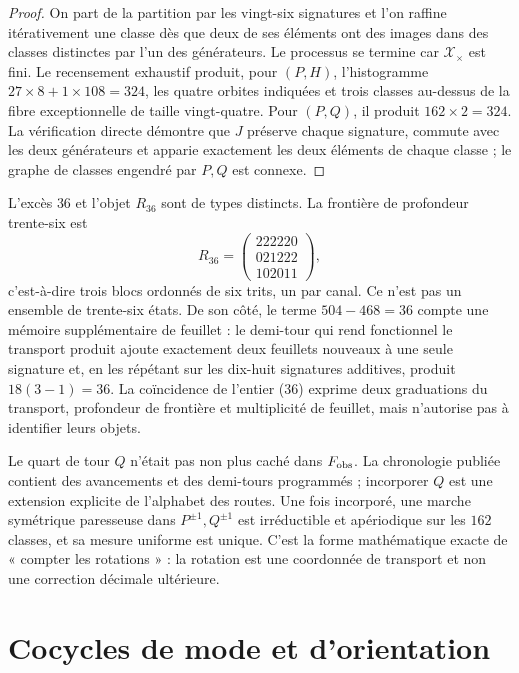 \begin{proof}
On part de la partition par les vingt-six signatures et l'on raffine
itérativement une classe dès que deux de ses éléments ont des images dans des
classes distinctes par l'un des générateurs. Le processus se termine car
\(\mathcal X_\times\) est fini. Le recensement exhaustif produit, pour
\((P,H)\), l'histogramme \(27\times8+1\times108=324\), les quatre orbites
indiquées et trois classes au-dessus de la fibre exceptionnelle de taille vingt-quatre.
Pour \((P,Q)\), il produit \(162\times2=324\). La vérification directe démontre
que \(J\) préserve chaque signature, commute avec les deux générateurs et apparie
exactement les deux éléments de chaque classe ; le graphe de classes engendré par
\(P,Q\) est connexe.
\end{proof}

L'excès \(36\) et l'objet \(R_{36}\) sont de types distincts. La frontière
de profondeur trente-six est
\[
 R_{36}=
 \begin{pmatrix}
 222220\\021222\\102011
 \end{pmatrix},
\]
c'est-à-dire trois blocs ordonnés de six trits, un par canal. Ce n'est pas un
ensemble de trente-six états. De son côté, le terme
\(504-468=36\) compte une mémoire supplémentaire de feuillet : le demi-tour qui rend
fonctionnel le transport produit ajoute exactement deux feuillets nouveaux à une
seule signature et, en les répétant sur les dix-huit signatures additives, produit
\(18(3-1)=36\). La coïncidence de l'entier (36) exprime deux graduations
du transport, profondeur de frontière et multiplicité de feuillet, mais
n'autorise pas à identifier leurs objets.

Le quart de tour \(Q\) n'était pas non plus caché dans \(F_{\rm obs}\). La
chronologie publiée contient des avancements et des demi-tours programmés ; incorporer
\(Q\) est une extension explicite de l'alphabet des routes. Une fois incorporé,
une marche symétrique paresseuse dans \(P^{\pm1},Q^{\pm1}\) est irréductible et
apériodique sur les \(162\) classes, et sa mesure uniforme est unique. C'est la
forme mathématique exacte de « compter les rotations » : la rotation est une coordonnée de
transport et non une correction décimale ultérieure.

\section{Cocycles de mode et d'orientation}
\label{sec:cociclos-modo-orientacion}

